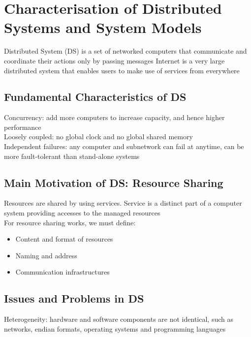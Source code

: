 \chapter{Characterisation of Distributed Systems and System Models}

\begin{multicols*}{2}

\noindent Distributed System (DS) is a set of networked computers that communicate and coordinate their actions only by passing messages
Internet is a very large distributed system that enables users to make use of services from everywhere

\section{Fundamental Characteristics of DS}

\noindent Concurrency: add more computers to increase capacity, and hence higher performance \\

\noindent Loosely coupled: no global clock and no global shared memory \\

\noindent Independent failures: any computer and subnetwork can fail at anytime, can be more fault-tolerant than stand-alone systems

\section {Main Motivation of DS: Resource Sharing}

\noindent Resources are shared by using services. Service is a distinct part of a computer system providing accesses to the managed resources \\

\noindent For resource sharing works, we must define:
\begin{itemize}
    \item Content and format of resources
    \item Naming and address
    \item Communication infrastructures
\end{itemize}

\section{Issues and Problems in DS}

\noindent Heterogeneity: hardware and software components are not identical, such as networks, endian formats, operating systems and programming languages\\


\end{multicols*}
